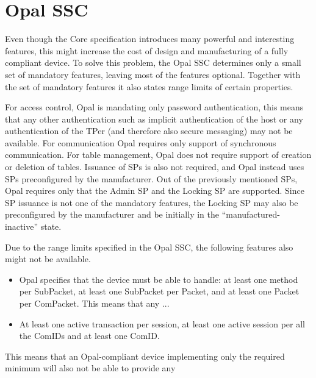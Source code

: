 




\section{Opal SSC}

Even though the Core specification introduces many powerful and interesting features, this might increase the cost of design and manufacturing of a fully compliant device. To solve this problem, the Opal SSC determines only a small set of mandatory features, leaving most of the features optional. Together with the set of mandatory features it also states range limits of certain properties.

For access control, Opal is mandating only password authentication, this means that any other authentication such as implicit authentication of the host or any authentication of the TPer (and therefore also secure messaging) may not be available. For communication Opal requires only support of synchronous communication. For table management, Opal does not require support of creation or deletion of tables. Issuance of SPs is also not required, and Opal instead uses SPs preconfigured by the manufacturer.
Out of the previously mentioned SPs, Opal requires only that the Admin SP and the Locking SP are supported. Since SP issuance is not one of the mandatory features, the Locking SP may also be preconfigured by the manufacturer and be initially in the ``manufactured-inactive'' state. 

Due to the range limits specified in the Opal SSC, the following features also might not be available.
\begin{itemize}
\item Opal specifies that the device must be able to handle: at least one method per SubPacket, at least one SubPacket per Packet, and at least one Packet per ComPacket. This means that any ...
\item At least one active transaction per session, at least one active session per all the ComIDs and at least one ComID.
\end{itemize}
This means that an Opal-compliant device implementing only the required minimum will also not be able to provide any

